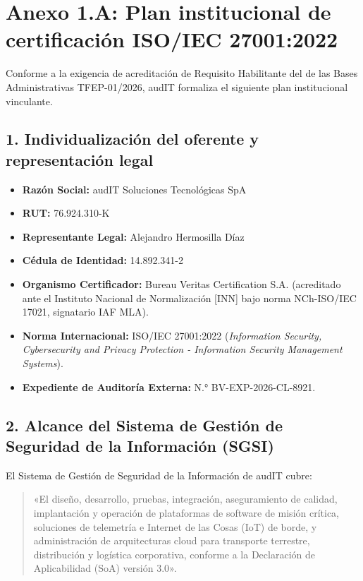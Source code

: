 
\section*{Anexo 1.A: Plan institucional de certificación ISO/IEC 27001:2022}\label{sec:1-anexo-iso}

Conforme a la exigencia de acreditación de Requisito Habilitante del  de las Bases Administrativas TFEP-01/2026, audIT formaliza el siguiente plan institucional vinculante.

\subsection*{1. Individualización del oferente y representación legal}
\begin{itemize}
  \item \textbf{Razón Social:} audIT Soluciones Tecnológicas SpA
  \item \textbf{RUT:} 76.924.310-K
  \item \textbf{Representante Legal:} Alejandro Hermosilla Díaz
  \item \textbf{Cédula de Identidad:} 14.892.341-2
  \item \textbf{Organismo Certificador:} Bureau Veritas Certification S.A. (acreditado ante el Instituto Nacional de Normalización [INN] bajo norma NCh-ISO/IEC 17021, signatario IAF MLA).
  \item \textbf{Norma Internacional:} ISO/IEC 27001:2022 (\textit{Information Security, Cybersecurity and Privacy Protection - Information Security Management Systems}).
  \item \textbf{Expediente de Auditoría Externa:} N.° BV-EXP-2026-CL-8921.
\end{itemize}

\subsection*{2. Alcance del Sistema de Gestión de Seguridad de la Información (SGSI)}
El Sistema de Gestión de Seguridad de la Información de audIT cubre:
\begin{quote}
«El diseño, desarrollo, pruebas, integración, aseguramiento de calidad, implantación y operación de plataformas de software de misión crítica, soluciones de telemetría e Internet de las Cosas (IoT) de borde, y administración de arquitecturas cloud para transporte terrestre, distribución y logística corporativa, conforme a la Declaración de Aplicabilidad (SoA) versión 3.0».
\end{quote}


